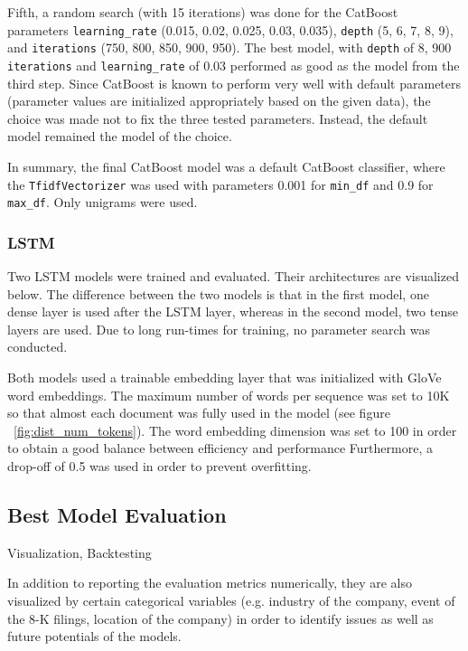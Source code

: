\documentclass{article}
\begin{document}
	Fifth, a random search (with 15 iterations) was done for the CatBoost parameters \lstinline{learning_rate} (0.015, 0.02, 0.025, 0.03, 0.035), \lstinline{depth} (5, 6, 7, 8, 9), and \lstinline{iterations} (750, 800, 850, 900, 950). The best model, with \lstinline{depth} of 8, 900 \lstinline{iterations} and \lstinline{learning_rate} of 0.03 performed as good as the model from the third step. Since CatBoost is known to perform very well with default parameters (parameter values are initialized appropriately based on the given data), the choice was made not to fix the three tested parameters. Instead, the default model remained the model of the choice.
	
	In summary, the final CatBoost model was a default CatBoost classifier, where the \lstinline{TfidfVectorizer} was used with parameters 0.001 for \lstinline{min_df} and 0.9 for \lstinline{max_df}. Only unigrams were used.
	
	\subsubsection{LSTM}
	
	Two LSTM models were trained and evaluated. Their architectures are visualized below. The difference between the two models is that in the first model, one dense layer is used after the LSTM layer, whereas in the second model, two tense layers are used. Due to long run-times for training, no parameter search was conducted.
	
	Both models used a trainable embedding layer that was initialized with GloVe word embeddings. The maximum number of words per sequence was set to 10K so that almost each document was fully used in the model (see figure ~\ref{fig:dist_num_tokens}). The word embedding dimension was set to 100 in order to obtain a good balance between efficiency and performance Furthermore, a drop-off of 0.5 was used in order to prevent overfitting.
	


	\subsection{Best Model Evaluation}
	
	Visualization, Backtesting
	
	In addition to reporting the evaluation metrics numerically, they are also visualized by certain categorical variables (e.g. industry of the company, event of the 8-K filings, location of the company) in order to identify issues as well as future potentials of the models. 
	
\end{document}
